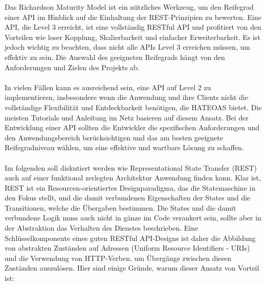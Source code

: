 Das Richardson Maturity Model ist ein nützliches Werkzeug, um den Reifegrad einer API im Hinblick auf die Einhaltung der REST-Prinzipien zu bewerten. Eine API, die Level 3 erreicht, ist eine vollständig RESTful API und profitiert von den Vorteilen wie loser Kopplung, Skalierbarkeit und einfacher Erweiterbarkeit. Es ist jedoch wichtig zu beachten, dass nicht alle APIs Level 3 erreichen müssen, um effektiv zu sein. Die Auswahl des geeigneten Reifegrads hängt von den Anforderungen und Zielen des Projekts ab.
\\\\
In vielen Fällen kann es ausreichend sein, eine API auf Level 2 zu implementieren, insbesondere wenn die Anwendung und ihre Clients nicht die vollständige Flexibilität und Entdeckbarkeit benötigen, die HATEOAS bietet. Die meisten Tutorials und Anleitung im Netz basieren auf diesem Ansatz. Bei der Entwicklung einer API sollten die Entwickler die spezifischen Anforderungen und den Anwendungsbereich berücksichtigen und das am besten geeignete Reifegradniveau wählen, um eine effektive und wartbare Lösung zu schaffen.
\\\\
Im folgenden soll diskutiert werden wie Representational State Transfer (REST) auch auf einer funktional zerlegten Architektur Anwendung finden kann.  Klar ist, REST ist ein Resourcen-orientiertes Designparadigma, das die Statemaschine in den Fokus stellt, und die damit verbundenen Eigenschaften der States und die Transitionen, welche die Übergaben bestimmen. Die States und die damit verbundene Logik muss auch nicht in gänze im Code verankert sein, sollte aber in der Abstraktion das Verhalten des Dienstes beschrieben. Eine Schlüsselkomponente eines guten RESTful API-Designs ist daher die Abbildung von abstrakten Zuständen auf Adressen (Uniform Resource Identifiers - URIs) und die Verwendung von HTTP-Verben, um Übergänge zwischen diesen Zuständen auszulösen. Hier sind einige Gründe, warum dieser Ansatz von Vorteil ist: 

